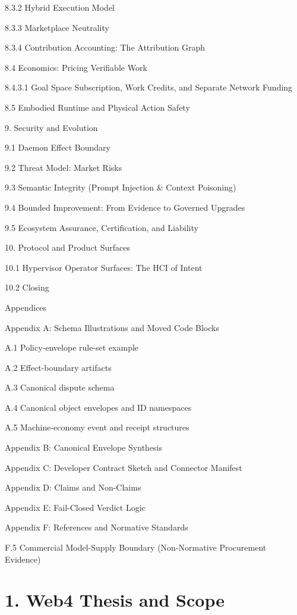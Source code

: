 \documentclass[
  11pt,
]{article}
\begin{document}
8.3.2 Hybrid Execution Model

8.3.3 Marketplace Neutrality

8.3.4 Contribution Accounting: The Attribution Graph

8.4 Economics: Pricing Verifiable Work

8.4.3.1 Goal Space Subscription, Work Credits, and Separate Network
Funding

8.5 Embodied Runtime and Physical Action Safety

9. Security and Evolution

9.1 Daemon Effect Boundary

9.2 Threat Model: Market Risks

9.3 Semantic Integrity (Prompt Injection \& Context Poisoning)

9.4 Bounded Improvement: From Evidence to Governed Upgrades

9.5 Ecosystem Assurance, Certification, and Liability

10. Protocol and Product Surfaces

10.1 Hypervisor Operator Surfaces: The HCI of Intent

10.2 Closing

Appendices

Appendix A: Schema Illustrations and Moved Code Blocks

A.1 Policy-envelope rule-set example

A.2 Effect-boundary artifacts

A.3 Canonical dispute schema

A.4 Canonical object envelopes and ID namespaces

A.5 Machine-economy event and receipt structures

Appendix B: Canonical Envelope Synthesis

Appendix C: Developer Contract Sketch and Connector Manifest

Appendix D: Claims and Non-Claims

Appendix E: Fail-Closed Verdict Logic

Appendix F: References and Normative Standards

F.5 Commercial Model-Supply Boundary (Non-Normative Procurement Evidence)

\hypertarget{web4-thesis-and-scope}{%
\section{\texorpdfstring{\textbf{1. Web4 Thesis and
Scope}}{1. Web4 Thesis and Scope}}\label{web4-thesis-and-scope}}
\end{document}
